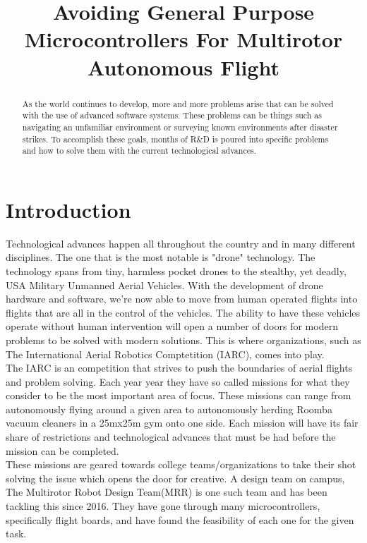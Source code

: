 \documentclass[conference,12pt, ]{IEEEtran}
\begin{document}
\title{Avoiding General Purpose Microcontrollers For Multirotor Autonomous Flight }

\author{
}


\maketitle

\doublespace
\begin{abstract}
As the world continues to develop, more and more problems arise that can be solved with the use of advanced software systems. These problems can be things such as navigating an unfamiliar environment or surveying known environments after disaster strikes. To accomplish these goals, months of R\&D is poured into specific problems and how to solve them with the current technological advances. 
\end{abstract}

\section{Introduction}
Technological advances happen all throughout the country and in many different disciplines. The one that is the most notable is "drone" technology. The technology spans from tiny, harmless pocket drones to the stealthy, yet deadly, USA Military Unmanned Aerial Vehicles. With the development of drone hardware and software, we're now able to move from human operated flights into flights that are all in the control of the vehicles. The ability to have these vehicles operate without human intervention will open a number of doors for modern problems to be solved with modern solutions. This is where organizations, such as The International Aerial Robotics Comptetition (IARC), comes into play.\\
The IARC is an competition that strives to push the boundaries of aerial flights and problem solving. Each year year they have so called missions for what they consider to be the most important area of focus. These missions can range from autonomously flying around a given area to autonomously herding Roomba vacuum cleaners in a 25mx25m gym onto one side. Each mission will have its fair share of restrictions and technological advances that must be had before the mission can be completed. \\
These missions are geared towards college teams/organizations to take their shot solving the issue which opens the door for creative. A design team on campus, The Multirotor Robot Design Team(MRR) is one such team and has been tackling this since 2016. They have gone through many microcontrollers, specifically flight boards, and have found the feasibility of each one for the given task.
\end{document}
